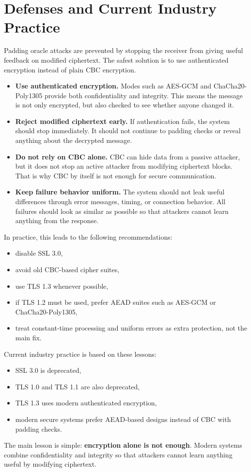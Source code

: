 \section{Defenses and Current Industry Practice}

Padding oracle attacks are prevented by stopping the receiver from giving useful feedback on modified ciphertext. The safest solution is to use authenticated encryption instead of plain CBC encryption.

\begin{itemize}
    \item \textbf{Use authenticated encryption.} Modes such as AES-GCM and ChaCha20-Poly1305 provide both confidentiality and integrity. This means the message is not only encrypted, but also checked to see whether anyone changed it.
    \item \textbf{Reject modified ciphertext early.} If authentication fails, the system should stop immediately. It should not continue to padding checks or reveal anything about the decrypted message.
    \item \textbf{Do not rely on CBC alone.} CBC can hide data from a passive attacker, but it does not stop an active attacker from modifying ciphertext blocks. That is why CBC by itself is not enough for secure communication.
    \item \textbf{Keep failure behavior uniform.} The system should not leak useful differences through error messages, timing, or connection behavior. All failures should look as similar as possible so that attackers cannot learn anything from the response.
\end{itemize}

In practice, this leads to the following recommendations:

\begin{itemize}
    \item disable SSL 3.0,
    \item avoid old CBC-based cipher suites,
    \item use TLS 1.3 whenever possible,
    \item if TLS 1.2 must be used, prefer AEAD suites such as AES-GCM or ChaCha20-Poly1305,
    \item treat constant-time processing and uniform errors as extra protection, not the main fix.
\end{itemize}

Current industry practice is based on these lessons:

\begin{itemize}
    \item SSL 3.0 is deprecated,
    \item TLS 1.0 and TLS 1.1 are also deprecated,
    \item TLS 1.3 uses modern authenticated encryption,
    \item modern secure systems prefer AEAD-based designs instead of CBC with padding checks.
\end{itemize}

The main lesson is simple: \textbf{encryption alone is not enough}. Modern systems combine confidentiality and integrity so that attackers cannot learn anything useful by modifying ciphertext.
